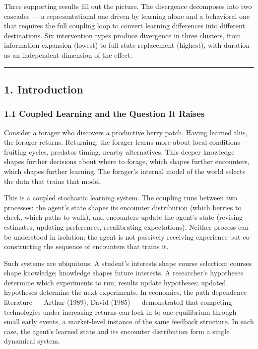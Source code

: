 \documentclass[
]{article}
\begin{document}
Three supporting results fill out the picture. The divergence decomposes
into two cascades --- a representational one driven by learning alone
and a behavioral one that requires the full coupling loop to convert
learning differences into different destinations. Six intervention types
produce divergence in three clusters, from information expansion
(lowest) to full state replacement (highest), with duration as an
independent dimension of the effect.

\begin{center}\rule{0.5\linewidth}{0.5pt}\end{center}

\subsection{1. Introduction}\label{introduction}

\subsubsection{1.1 Coupled Learning and the Question It
Raises}\label{coupled-learning-and-the-question-it-raises}

Consider a forager who discovers a productive berry patch. Having
learned this, the forager returns. Returning, the forager learns more
about local conditions --- fruiting cycles, predator timing, nearby
alternatives. This deeper knowledge shapes further decisions about where
to forage, which shapes further encounters, which shapes further
learning. The forager's internal model of the world selects the data
that trains that model.

This is a coupled stochastic learning system. The coupling runs between
two processes: the agent's state shapes its encounter distribution
(which berries to check, which paths to walk), and encounters update the
agent's state (revising estimates, updating preferences, recalibrating
expectations). Neither process can be understood in isolation; the agent
is not passively receiving experience but co-constructing the sequence
of encounters that trains it.

Such systems are ubiquitous. A student's interests shape course
selection; courses shape knowledge; knowledge shapes future interests. A
researcher's hypotheses determine which experiments to run; results
update hypotheses; updated hypotheses determine the next experiments. In
economics, the path-dependence literature --- Arthur (1989), David
(1985) --- demonstrated that competing technologies under increasing
returns can lock in to one equilibrium through small early events, a
market-level instance of the same feedback structure. In each case, the
agent's learned state and its encounter distribution form a single
dynamical system.
\end{document}
